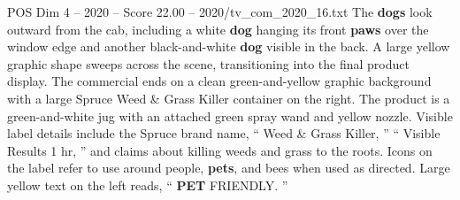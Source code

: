 \begin{textsample}{POS Dim 4 – 2020 – Score 22.00 – 2020/tv\_com\_2020\_16.txt}
The \textbf{dogs} look outward from the cab, including a white \textbf{dog} hanging its front \textbf{paws} over the window edge and another black-and-white \textbf{dog} visible in the back.
A large yellow graphic shape sweeps across the scene, transitioning into the final product display.
The commercial ends on a clean green-and-yellow graphic background with a large Spruce Weed \& Grass Killer container on the right.
The product is a green-and-white jug with an attached green spray wand and yellow nozzle.
Visible label details include the Spruce brand name, “ Weed \& Grass Killer, ” “ Visible Results 1 hr, ” and claims about killing weeds and grass to the roots.
Icons on the label refer to use around people, \textbf{pets}, and bees when used as directed.
Large yellow text on the left reads, “ \textbf{PET} FRIENDLY. ”

\end{textsample}
